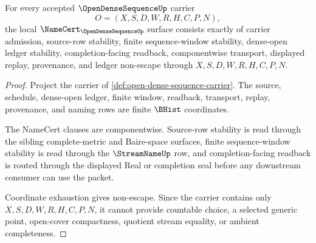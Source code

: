 \begin{theorem}
\label{thm:open-dense-sequence-namecert-obligations}
For every accepted $\OpenDenseSequenceUp$ carrier
$$
O=(X,S,D,W,R,H,C,P,N),
$$
the local $\NameCert_{\OpenDenseSequenceUp}$ surface consists exactly of carrier admission, source-row stability, finite sequence-window stability, dense-open ledger stability, completion-facing readback, componentwise transport, displayed replay, provenance, and ledger non-escape through $X,S,D,W,R,H,C,P,N$.
\end{theorem}
\begin{proof}
Project the carrier of \autoref{def:open-dense-sequence-carrier}. The source, schedule, dense-open ledger, finite window, readback, transport, replay, provenance, and naming rows are finite $\BHist$ coordinates.

The NameCert clauses are componentwise. Source-row stability is read through the sibling complete-metric and Baire-space surfaces, finite sequence-window stability is read through the $\StreamNameUp$ row, and completion-facing readback is routed through the displayed Real or completion seal before any downstream consumer can use the packet.

Coordinate exhaustion gives non-escape. Since the carrier contains only $X,S,D,W,R,H,C,P,N$, it cannot provide countable choice, a selected generic point, open-cover compactness, quotient stream equality, or ambient completeness.
\end{proof}

\begin{closurestatus}{\OpenDenseSequenceUp}
  \theoryclosure{\seedClosure}
  \formalstatus{\unformalizedV}
\end{closurestatus}
